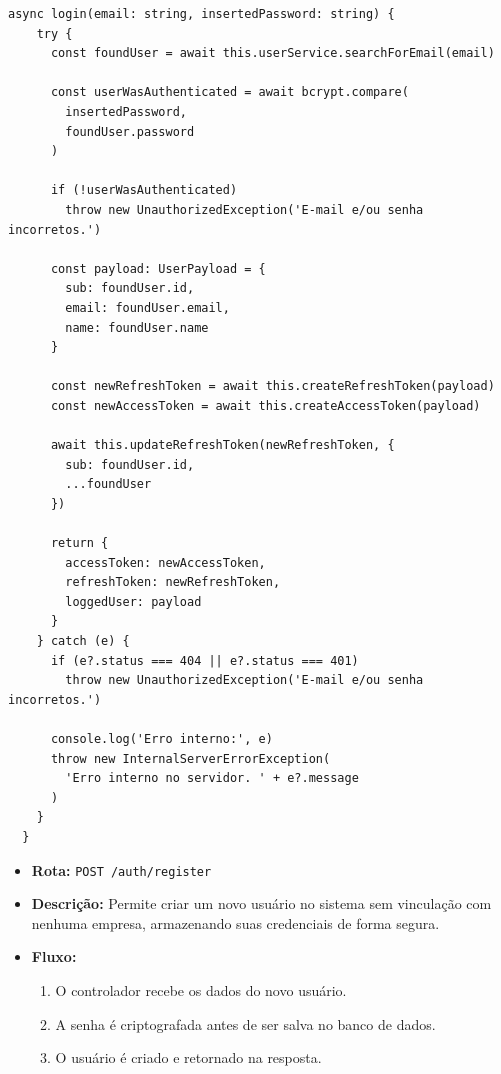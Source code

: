 \begin{lstlisting}[caption={Exemplo de \textit{service} para \textit{login}.},label={cod:login-service}]
	async login(email: string, insertedPassword: string) {
    try {
      const foundUser = await this.userService.searchForEmail(email)

      const userWasAuthenticated = await bcrypt.compare(
        insertedPassword,
        foundUser.password
      )

      if (!userWasAuthenticated)
        throw new UnauthorizedException('E-mail e/ou senha incorretos.')

      const payload: UserPayload = {
        sub: foundUser.id,
        email: foundUser.email,
        name: foundUser.name
      }

      const newRefreshToken = await this.createRefreshToken(payload)
      const newAccessToken = await this.createAccessToken(payload)

      await this.updateRefreshToken(newRefreshToken, {
        sub: foundUser.id,
        ...foundUser
      })

      return {
        accessToken: newAccessToken,
        refreshToken: newRefreshToken,
        loggedUser: payload
      }
    } catch (e) {
      if (e?.status === 404 || e?.status === 401)
        throw new UnauthorizedException('E-mail e/ou senha incorretos.')

      console.log('Erro interno:', e)
      throw new InternalServerErrorException(
        'Erro interno no servidor. ' + e?.message
      )
    }
  }
\end{lstlisting}

\begin{itemize}
	\item \textbf{Rota:} \texttt{POST /auth/register}
	\item \textbf{Descrição:} Permite criar um novo usuário no sistema sem vinculação com nenhuma empresa, armazenando suas credenciais de forma segura.
	\item \textbf{Fluxo:}
	\begin{enumerate}
		\item O controlador recebe os dados do novo usuário.
		\item A senha é criptografada antes de ser salva no banco de dados.
		\item O usuário é criado e retornado na resposta.
	\end{enumerate}
\end{itemize}

